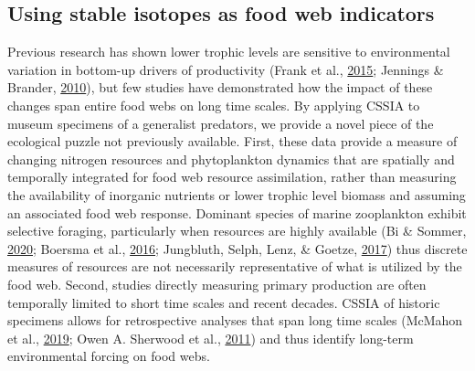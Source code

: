 \documentclass [11pt, proquest] {uwthesis}[2015/03/03]
\begin{document}
\subsection{Using stable isotopes as food web
indicators}\label{using-stable-isotopes-as-food-web-indicators}

Previous research has shown lower trophic levels are sensitive to
environmental variation in bottom-up drivers of productivity (Frank et
al., \protect\hyperlink{ref-Frank2015}{2015}; Jennings \& Brander,
\protect\hyperlink{ref-Jennings2010}{2010}), but few studies have
demonstrated how the impact of these changes span entire food webs on
long time scales. By applying CSSIA to museum specimens of a generalist
predators, we provide a novel piece of the ecological puzzle not
previously available. First, these data provide a measure of changing
nitrogen resources and phytoplankton dynamics that are spatially and
temporally integrated for food web resource assimilation, rather than
measuring the availability of inorganic nutrients or lower trophic level
biomass and assuming an associated food web response. Dominant species
of marine zooplankton exhibit selective foraging, particularly when
resources are highly available (Bi \& Sommer,
\protect\hyperlink{ref-Bi2020}{2020}; Boersma et al.,
\protect\hyperlink{ref-Boersma2015}{2016}; Jungbluth, Selph, Lenz, \&
Goetze, \protect\hyperlink{ref-Jungbluth2017}{2017}) thus discrete
measures of resources are not necessarily representative of what is
utilized by the food web. Second, studies directly measuring primary
production are often temporally limited to short time scales and recent
decades. CSSIA of historic specimens allows for retrospective analyses
that span long time scales (McMahon et al.,
\protect\hyperlink{ref-McMahon2019}{2019}; Owen A. Sherwood et al.,
\protect\hyperlink{ref-Sherwood2011}{2011}) and thus identify long-term
environmental forcing on food webs.
\end{document}
